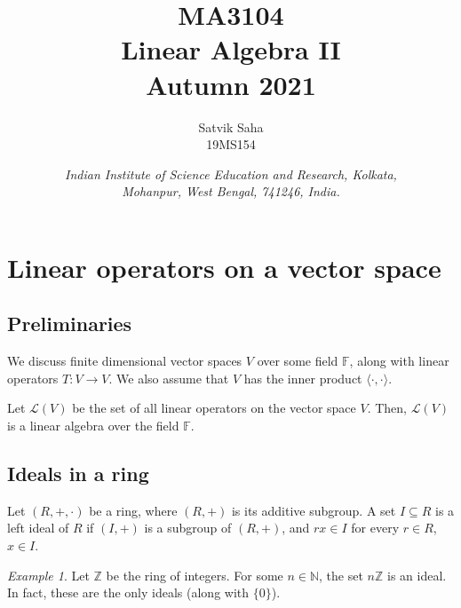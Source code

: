 \documentclass[11pt]{article}
\title{
    \Large\textsc{MA3104} \\
    \Huge \textbf{Linear Algebra II} \\
    \vspace{5pt}
    \Large{Autumn 2021}
}
\author{
    \large Satvik Saha
    \\\textsc{\small 19MS154}
}
\date{\normalsize
    \textit{Indian Institute of Science Education and Research, Kolkata, \\
    Mohanpur, West Bengal, 741246, India.} \\
}
\newcommand{\Z}{\mathbb{Z}}
\newcommand{\N}{\mathbb{N}}
\newcommand{\F}{\mathbb{F}}
\newcommand{\alg}[1]{\mathscr{#1}}
\newcommand{\algL}{\alg{L}}
\newcommand{\ip}[2]{\langle #1, #2 \rangle}
\theoremstyle{definition}
\theoremstyle{remark}
\newtheorem*{example}{Example}
\numberwithin{equation}{section}
\begin{document}
    \maketitle

    \tableofcontents

    \section{Linear operators on a vector space}

    \subsection{Preliminaries}
    We discuss finite dimensional vector spaces $V$ over some field $\F$, along with
    linear operators $T\colon V \to V$. We also assume that $V$ has the inner
    product $\ip{\cdot}{\cdot}$.

    \begin{theorem}
        Let $\algL(V)$ be the set of all linear operators on the vector space $V$.
        Then, $\algL(V)$ is a linear algebra over the field $\F$.
    \end{theorem}

    \subsection{Ideals in a ring}
    \begin{definition}
        Let $(R, +, \cdot)$ be a ring, where $(R, +)$ is its additive subgroup. A set
        $I \subseteq R$ is a left ideal of $R$ if $(I, +)$ is a subgroup of $(R, +)$,
        and $rx \in I$ for every $r \in R$, $x \in I$.
    \end{definition}
    \begin{example}
        Let $\Z$ be the ring of integers. For some $n \in \N$, the set $n\Z$ is an
        ideal. In fact, these are the only ideals (along with $\{0\}$).
    \end{example}
\end{document}
